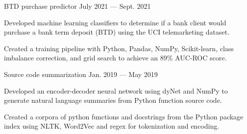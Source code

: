 
\vspace{-0.1cm}

\begin{cventries}

  \cventry
    {} %
    {BTD purchase predictor \href{https://github.com/pauldhein/marketing-campaign-classifier}{\faExternalLink}} %
    {July 2021 --- Sept. 2021} %
    {} %
    {
      \vspace{-1cm}
      \begin{cvitems} %
        \item Developed machine learning classifiers to determine if a bank client would purchase a bank term deposit (BTD) using the UCI telemarketing dataset.
        \item Created a training pipeline with Python, Pandas, NumPy, Scikit-learn, class imbalance correction, and grid search to achieve an 89\% AUC-ROC score. 
      \end{cvitems}
    }
  \vspace{.2cm}
  \cventry
    {} %
    {Source code summarization \href{https://github.com/pauldhein/code-summarization}{\faExternalLink}} %
    {Jan. 2019 --- May 2019} %
    {} %
    {
      \vspace{-1cm}
      \begin{cvitems} %
        \item Developed an encoder-decoder neural network using dyNet and NumPy to generate natural language summaries from Python function source code.
        \item Created a corpora of python functions and docstrings from the Python package index using NLTK, Word2Vec and regex for tokenization and encoding.
      \end{cvitems}
    }

\end{cventries}
